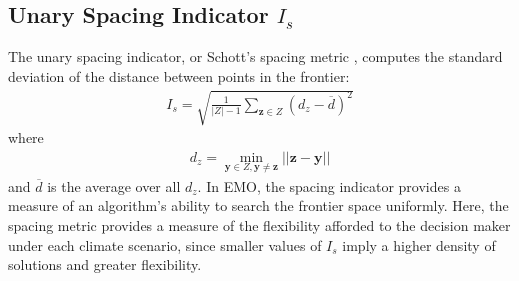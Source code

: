 \subsection{Unary Spacing Indicator $I_s$} The unary spacing indicator, or Schott's spacing metric \cite{schott1995fault}, computes the standard deviation of the distance between points in the frontier:
\begin{align}
I_s = \sqrt{\frac{1}{|Z|-1} \sum_{\mathbf{z} \in Z} (d_z - \overbar{d})^2}
\end{align}
where
\begin{align}
d_z = \min_{\mathbf{y} \in Z, \mathbf{y} \neq \mathbf{z}} ||\mathbf{z} - \mathbf{y}||
\end{align}
and $\overbar{d}$ is the average over all $d_z$. In EMO, the spacing indicator provides a measure of an algorithm's ability to search the frontier space uniformly. Here, the spacing metric provides a measure of the flexibility afforded to the decision maker under each climate scenario, since smaller values of $I_s$ imply a higher density of solutions and greater flexibility.